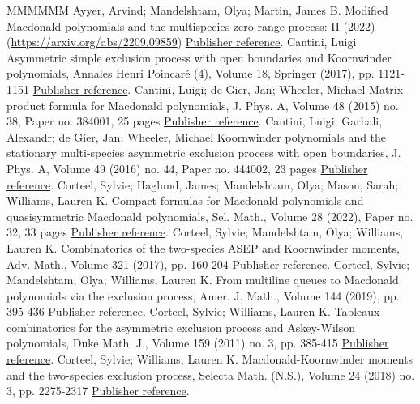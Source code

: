 \documentclass[11pt]{article}
\theoremstyle{definition}
\numberwithin{equation}{section}
\begin{document}
\begin{thebibliography}{MMMMMM}
 Ayyer, Arvind; Mandelshtam, Olya; Martin, James B. Modified Macdonald polynomials and the multispecies zero range process: II (2022) (\url{https://arxiv.org/abs/2209.09859}) \href{https://alco.centre-mersenne.org/articles/10.5802/alco.248/#AMM22}{Publisher reference}.
 Cantini, Luigi Asymmetric simple exclusion process with open boundaries and Koornwinder polynomials, Annales Henri Poincaré (4), Volume 18, Springer (2017), pp. 1121-1151 \href{https://alco.centre-mersenne.org/articles/10.5802/alco.248/#cantini-2017}{Publisher reference}.
 Cantini, Luigi; de Gier, Jan; Wheeler, Michael Matrix product formula for Macdonald polynomials, J. Phys. A, Volume 48 (2015) no. 38, Paper no. 384001, 25 pages \href{https://alco.centre-mersenne.org/articles/10.5802/alco.248/#CGW-2015}{Publisher reference}.
 Cantini, Luigi; Garbali, Alexandr; de Gier, Jan; Wheeler, Michael Koornwinder polynomials and the stationary multi-species asymmetric exclusion process with open boundaries, J. Phys. A, Volume 49 (2016) no. 44, Paper no. 444002, 23 pages \href{https://alco.centre-mersenne.org/articles/10.5802/alco.248/#cantini-etal-2016}{Publisher reference}.
 Corteel, Sylvie; Haglund, James; Mandelshtam, Olya; Mason, Sarah; Williams, Lauren K. Compact formulas for Macdonald polynomials and quasisymmetric Macdonald polynomials, Sel. Math., Volume 28 (2022), Paper no. 32, 33 pages \href{https://alco.centre-mersenne.org/articles/10.5802/alco.248/#compactformula}{Publisher reference}.
 Corteel, Sylvie; Mandelshtam, Olya; Williams, Lauren K. Combinatorics of the two-species ASEP and Koornwinder moments, Adv. Math., Volume 321 (2017), pp. 160-204 \href{https://alco.centre-mersenne.org/articles/10.5802/alco.248/#CMW-2017}{Publisher reference}.
 Corteel, Sylvie; Mandelshtam, Olya; Williams, Lauren K. From multiline queues to Macdonald polynomials via the exclusion process, Amer. J. Math., Volume 144 (2019), pp. 395-436 \href{https://alco.centre-mersenne.org/articles/10.5802/alco.248/#CMW18}{Publisher reference}.
 Corteel, Sylvie; Williams, Lauren K. Tableaux combinatorics for the asymmetric exclusion process and Askey-Wilson polynomials, Duke Math. J., Volume 159 (2011) no. 3, pp. 385-415 \href{https://alco.centre-mersenne.org/articles/10.5802/alco.248/#CW11}{Publisher reference}.
 Corteel, Sylvie; Williams, Lauren K. Macdonald-Koornwinder moments and the two-species exclusion process, Selecta Math. (N.S.), Volume 24 (2018) no. 3, pp. 2275-2317 \href{https://alco.centre-mersenne.org/articles/10.5802/alco.248/#CW18}{Publisher reference}.

\end{thebibliography}
\end{document}
